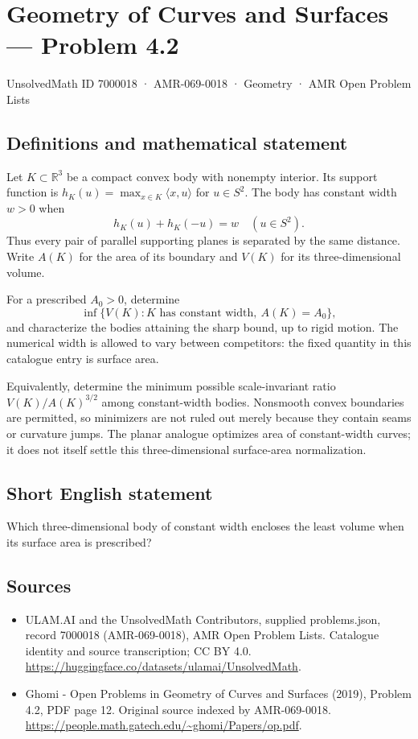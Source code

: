 \documentclass[11pt,a4paper]{article}
\begin{document}
\section*{Geometry of Curves and Surfaces — Problem 4.2}\label{7000018}
{\small UnsolvedMath ID 7000018 · AMR-069-0018 · Geometry · AMR Open Problem Lists}
\subsection{Definitions and mathematical statement}
Let $K\subset\mathbb R^3$ be a compact convex body with nonempty
interior. Its support function is
$h_K(u)=\max_{x\in K}\langle x,u\rangle$ for $u\in S^2$.
The body has constant width $w>0$ when
\[
                         h_K(u)+h_K(-u)=w\quad(u\in S^2).
\]
Thus every pair of parallel supporting planes is separated by
the same distance. Write $A(K)$ for the area of its boundary
and $V(K)$ for its three-dimensional volume.

For a prescribed $A_0>0$, determine
\[
       \inf\{V(K):K\text{ has constant width},\ A(K)=A_0\},
\]
and characterize the bodies attaining the sharp bound, up to
rigid motion. The numerical width is allowed to vary between
competitors: the fixed quantity in this catalogue entry is
surface area.

Equivalently, determine the minimum possible scale-invariant
ratio $V(K)/A(K)^{3/2}$ among constant-width bodies. Nonsmooth
convex boundaries are permitted, so minimizers are not ruled
out merely because they contain seams or curvature jumps.
The planar analogue optimizes area of constant-width curves;
it does not itself settle this three-dimensional surface-area
normalization.
\subsection{Short English statement}
Which three-dimensional body of constant width encloses the least
volume when its surface area is prescribed?
\subsection{Sources}
\begin{itemize}
\item[S1] ULAM.AI and the UnsolvedMath Contributors, supplied problems.json, record 7000018 (AMR-069-0018), AMR Open Problem Lists. Catalogue identity and source transcription; CC BY 4.0.
\url{https://huggingface.co/datasets/ulamai/UnsolvedMath}.
\item[S2] Ghomi - Open Problems in Geometry of Curves and Surfaces (2019), Problem 4.2, PDF page 12. Original source indexed by AMR-069-0018.
\url{https://people.math.gatech.edu/~ghomi/Papers/op.pdf}.
\end{itemize}
\end{document}
